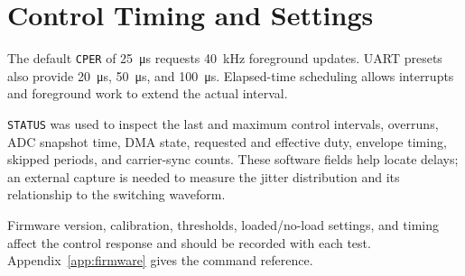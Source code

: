 \section{Control Timing and Settings}
\label{sec:ctrl-timing}

The default \texttt{CPER} of \SI{25}{\micro\second} requests \SI{40}{\kilo\hertz} foreground updates. UART presets also provide \SI{20}{\micro\second}, \SI{50}{\micro\second}, and \SI{100}{\micro\second}. Elapsed-time scheduling allows interrupts and foreground work to extend the actual interval.

\texttt{STATUS} was used to inspect the last and maximum control intervals, overruns, ADC snapshot time, DMA state, requested and effective duty, envelope timing, skipped periods, and carrier-sync counts. These software fields help locate delays; an external capture is needed to measure the jitter distribution and its relationship to the switching waveform.

Firmware version, calibration, thresholds, loaded/no-load settings, and timing affect the control response and should be recorded with each test. Appendix~\ref{app:firmware} gives the command reference.

